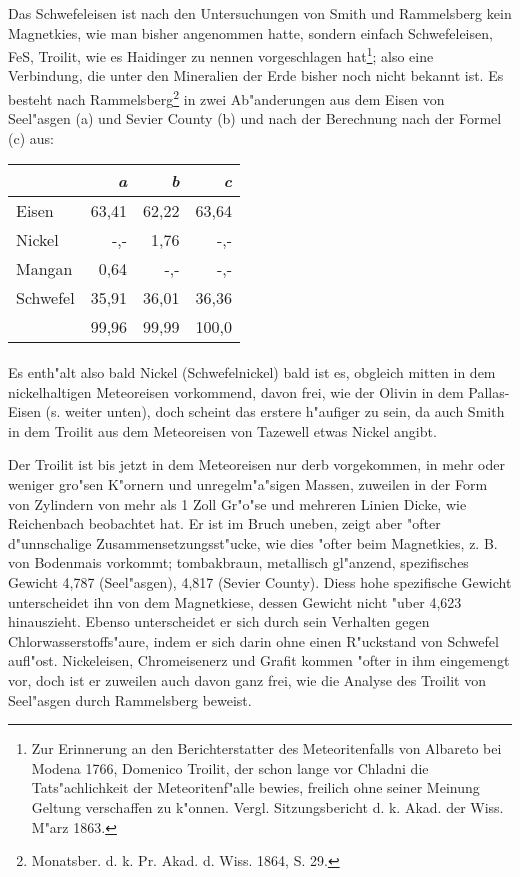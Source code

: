 \documentclass[a4paper, 11pt, oneside]{article}
\begin{document}
Das Schwefeleisen ist nach den Untersuchungen von Smith und Rammelsberg kein Magnetkies, wie man bisher angenommen hatte, sondern einfach Schwefeleisen, FeS, Troilit, wie es Haidinger zu nennen vorgeschlagen hat\footnote{Zur Erinnerung an den Berichterstatter des Meteoritenfalls von Albareto bei Modena 1766, Domenico Troilit, der schon lange vor Chladni die Tats"achlichkeit der Meteoritenf"alle bewies, freilich ohne seiner Meinung Geltung verschaffen zu k"onnen. Vergl. Sitzungsbericht d. k. Akad. der Wiss. M"arz 1863.}; also eine Verbindung, die unter den Mineralien der Erde bisher noch nicht bekannt ist. Es besteht nach Rammelsberg\footnote{Monatsber. d. k. Pr. Akad. d. Wiss. 1864, S. 29.} in zwei Ab"anderungen aus dem Eisen von Seel"asgen (a) und Sevier County (b) und nach der Berechnung nach der Formel (c) aus:
\begin{center}
\begin{tabular}{ |l|r|r|r| }
    \hline
     & \emph{a} & \emph{b} & \emph{c}\\
    \hline\hline
    Eisen & 63,41 & 62,22 & 63,64\\\hline
    Nickel & -,- & 1,76 & -,-\\\hline
    Mangan & 0,64 & -,- & -,-\\\hline
    Schwefel & 35,91 & 36,01 & 36,36\\\hline
     & 99,96 & 99,99 & 100,0\\
    \hline
\end{tabular}
\end{center}
\paragraph{}
Es enth"alt also bald Nickel (Schwefelnickel) bald ist es, obgleich mitten in dem nickelhaltigen Meteoreisen vorkommend, davon frei, wie der Olivin in dem Pallas-Eisen (s. weiter unten), doch scheint das erstere h"aufiger zu sein, da auch Smith in dem Troilit aus dem Meteoreisen von Tazewell etwas Nickel angibt. 

Der Troilit ist bis jetzt in dem Meteoreisen nur derb vorgekommen, in mehr oder weniger gro"sen K"ornern und unregelm"a"sigen Massen, zuweilen in der Form von Zylindern von mehr als 1 Zoll Gr"o"se und mehreren Linien Dicke, wie Reichenbach beobachtet hat. Er ist im Bruch uneben, zeigt aber "ofter d"unnschalige Zusammensetzungsst"ucke, wie dies "ofter beim Magnetkies, z. B. von Bodenmais vorkommt; tombakbraun, metallisch gl"anzend, spezifisches Gewicht 4,787 (Seel"asgen), 4,817 (Sevier County). Diess hohe spezifische Gewicht unterscheidet ihn von dem Magnetkiese, dessen Gewicht nicht "uber 4,623 hinauszieht. Ebenso unterscheidet er sich durch sein Verhalten gegen Chlorwasserstoffs"aure, indem er sich darin ohne einen R"uckstand von Schwefel aufl"ost. Nickeleisen, Chromeisenerz und Grafit kommen "ofter in ihm eingemengt vor, doch ist er zuweilen auch davon ganz frei, wie die Analyse des Troilit von Seel"asgen durch Rammelsberg beweist.
\end{document}
